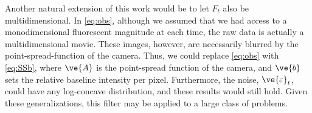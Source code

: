 \documentclass[12pt]{article}
\begin{document}
Another natural extension of this work would be to let $F_t$ also be multidimensional.  In \eqref{eq:obs}, although we assumed that we had access to a monodimensional fluorescent magnitude at each time, the raw data is actually a multidimensional movie. These images, however, are necessarily blurred by the point-spread-function of the camera.  Thus, we could replace \eqref{eq:obs} with \eqref{eq:SSb}, where $\ve{A}$ is the point-spread function of the camera, and $\ve{b}$ sets the relative baseline intensity per pixel. %
Furthermore, the noise, $\ve{\varepsilon}_t$, could have any log-concave distribution, and these results would still hold. Given these generalizations, this filter may be applied to a large class of problems.
\end{document}
